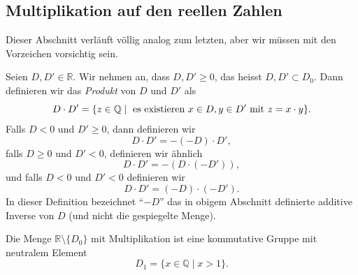 \documentclass[../main.tex]{subfiles}
\begin{document}
\subsection*{Multiplikation auf den reellen Zahlen}
Dieser Abschnitt verläuft völlig analog zum letzten,
aber wir müssen mit den Vorzeichen vorsichtig sein.

\begin{definition}
Seien
$D ,D' \in \mathbb R$. Wir nehmen an, dass $D, D' \geq 0$,
das heisst $D, D' \subset D_{0}$. Dann definieren wir das \textit{Produkt}
von $D$ und $D'$ als
\[D \cdot D' = \{z \in \mathbb Q \mid \textup{ es existieren } x \in D,
  y \in D' \textup{ mit } z = x \cdot y\}.\]
Falls $D < 0$ und $D' \geq 0$, dann definieren wir
\[D \cdot D' = -(-D) \cdot D',\]
falls $D \geq 0$ und $D' < 0$, definieren wir ähnlich
\[D \cdot D' = -(D \cdot (-D')),\]
und falls $D < 0$ und $D' < 0$ definieren wir
\[D \cdot D' = (-D) \cdot (-D').\]
In dieser Definition bezeichnet ``$-D$'' das in obigem Abschnitt
definierte additive Inverse von $D$ (und nicht die gespiegelte Menge).
\end{definition}

\begin{manuallemma}{2}
  Die Menge $\mathbb R \setminus \{D_{0}\}$ mit Multiplikation ist eine
  kommutative Gruppe mit neutralem Element
  \[D_{1} = \{x \in \mathbb Q \mid x > 1\}.\]
\end{manuallemma}
\end{document}
